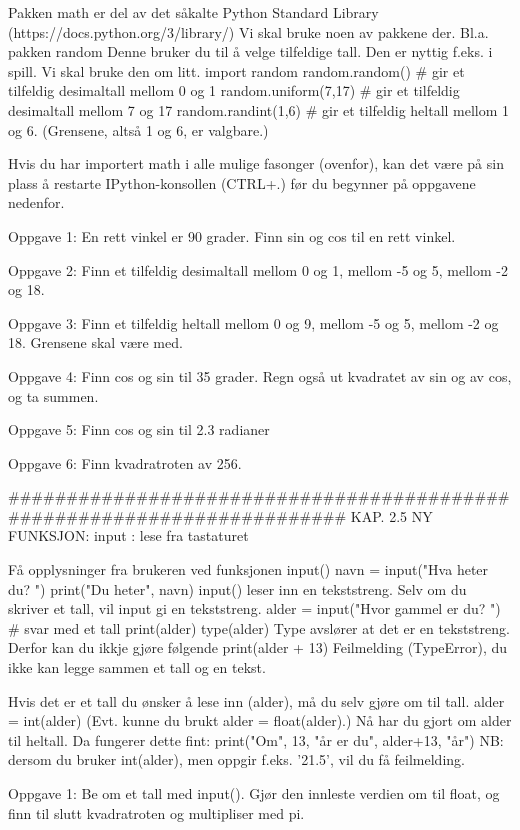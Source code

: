 \documentclass[a4paper,11pt,utf8]{book}
\begin{document}
Pakken math er del av det såkalte Python Standard Library
(https://docs.python.org/3/library/)
Vi skal bruke noen av pakkene der.
Bl.a. pakken random
Denne bruker du til å velge tilfeldige tall.
Den er nyttig f.eks. i spill. Vi skal bruke den om litt. 
import random
random.random()          # gir et tilfeldig desimaltall mellom 0 og 1
random.uniform(7,17)     # gir et tilfeldig desimaltall mellom 7 og 17
random.randint(1,6)      # gir et tilfeldig heltall mellom 1 og 6. (Grensene, altså 1 og 6, er valgbare.) 


Hvis du har importert math i alle mulige fasonger (ovenfor),
kan det være på sin plass å restarte IPython-konsollen (CTRL+.)
før du begynner på oppgavene nedenfor. 


Oppgave 1: En rett vinkel er 90 grader. Finn sin og cos til en rett vinkel.

Oppgave 2: Finn et tilfeldig desimaltall mellom 0 og 1, mellom -5 og 5, mellom -2 og 18.

Oppgave 3: Finn et tilfeldig heltall mellom 0 og 9, mellom -5 og 5, mellom -2 og 18.
Grensene skal være med. 

Oppgave 4: Finn cos og sin til 35 grader.
Regn også ut kvadratet av sin og av cos, og ta summen.

Oppgave 5: Finn cos og sin til 2.3 radianer 

Oppgave 6: Finn kvadratroten av 256. 


######################################################################## 
KAP. 2.5  NY FUNKSJON: input : lese fra tastaturet 

Få opplysninger fra brukeren ved funksjonen input()
navn = input("Hva heter du? ") 
print("Du heter", navn)
input() leser inn en tekststreng. 
Selv om du skriver et tall, vil input gi en tekststreng. 
alder = input("Hvor gammel er du? ")   # svar med et tall 
print(alder)
type(alder)
Type avslører at det er en tekststreng.
Derfor kan du ikkje gjøre følgende
print(alder + 13)
Feilmelding (TypeError), du ikke kan legge sammen et tall og en tekst. 

Hvis det er et tall du ønsker å lese inn (alder), må du selv gjøre om til tall. 
alder = int(alder)
(Evt. kunne du brukt alder = float(alder).)
Nå har du gjort om alder til heltall.
Da fungerer dette fint: 
print("Om", 13, "år er du", alder+13, "år") 
NB: dersom du bruker int(alder), men oppgir f.eks. '21.5', vil du få feilmelding. 


Oppgave 1: Be om et tall med input(). Gjør den innleste verdien om til float,
og finn til slutt kvadratroten og multipliser med pi. 
\end{document}
